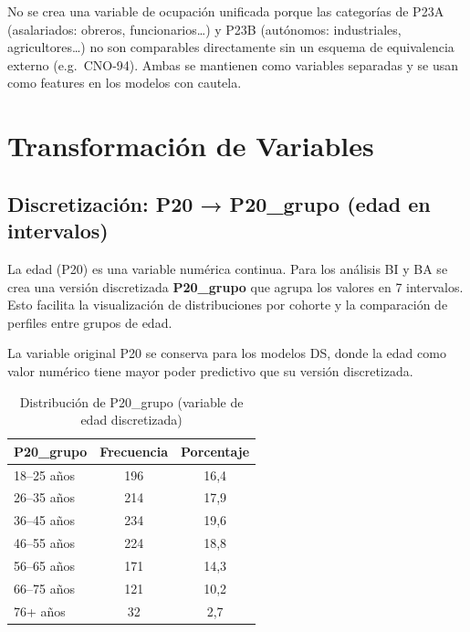 \documentclass[12pt,a4paper]{article}
\newcommand{\thead}[1]{\cellcolor{tableheader}\color{white}\textbf{#1}}
\begin{document}
\begin{notebox}
No se crea una variable de ocupación unificada porque las categorías de P23A (asalariados: obreros, funcionarios\ldots) y P23B (autónomos: industriales, agricultores\ldots) no son comparables directamente sin un esquema de equivalencia externo (e.g.\ CNO-94). Ambas se mantienen como variables separadas y se usan como features en los modelos con cautela.
\end{notebox}

\newpage

\section{Transformación de Variables}

\subsection{Discretización: P20 → P20\_grupo (edad en intervalos)}

La edad (P20) es una variable numérica continua. Para los análisis BI y BA se crea una versión discretizada \textbf{P20\_grupo} que agrupa los valores en 7 intervalos. Esto facilita la visualización de distribuciones por cohorte y la comparación de perfiles entre grupos de edad.

La variable original P20 se conserva para los modelos DS, donde la edad como valor numérico tiene mayor poder predictivo que su versión discretizada.

\begin{table}[H]
\centering
\renewcommand{\arraystretch}{1.3}
\begin{tabular}{lcc}
\toprule
\thead{P20\_grupo} & \thead{Frecuencia} & \thead{Porcentaje} \\
\midrule
18--25 años & 196 & 16,4 \\
\rowcolor{tablerow}
26--35 años & 214 & 17,9 \\
36--45 años & 234 & 19,6 \\
\rowcolor{tablerow}
46--55 años & 224 & 18,8 \\
56--65 años & 171 & 14,3 \\
\rowcolor{tablerow}
66--75 años & 121 & 10,2 \\
76+ años    &  32 &  2,7 \\
\bottomrule
\end{tabular}
\caption{Distribución de P20\_grupo (variable de edad discretizada)}
\end{table}
\end{document}
